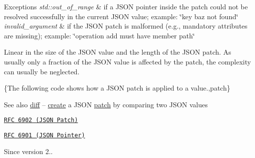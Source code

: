 \begin{DoxyExceptions}{Exceptions}
{\em std\+::out\+\_\+of\+\_\+range} & if a J\+S\+ON pointer inside the patch could not be resolved successfully in the current J\+S\+ON value; example\+: {\ttfamily \char`\"{}key baz
not found\char`\"{}} \\
\hline
{\em invalid\+\_\+argument} & if the J\+S\+ON patch is malformed (e.\+g., mandatory attributes are missing); example\+: {\ttfamily \char`\"{}operation add must have member path\char`\"{}}\\
\hline
\end{DoxyExceptions}
Linear in the size of the J\+S\+ON value and the length of the J\+S\+ON patch. As usually only a fraction of the J\+S\+ON value is affected by the patch, the complexity can usually be neglected.

\{The following code shows how a J\+S\+ON patch is applied to a value.,patch\}

\begin{DoxySeeAlso}{See also}
\hyperlink{classnlohmann_1_1basic__json_a5ef1934868b90452a4a34695489c60cd}{diff} -- \hyperlink{classnlohmann_1_1basic__json_afdb7a485369fbfd8c4c7c134ebb1feb5}{create} a J\+S\+ON \hyperlink{classnlohmann_1_1basic__json_aff9d131320db407da31304fb2b5cb7a5}{patch} by comparing two J\+S\+ON values

\href{https://tools.ietf.org/html/rfc6902}{\tt R\+FC 6902 (J\+S\+ON Patch)} 

\href{https://tools.ietf.org/html/rfc6901}{\tt R\+FC 6901 (J\+S\+ON Pointer)}
\end{DoxySeeAlso}
\begin{DoxySince}{Since}
version 2.. 
\end{DoxySince}
\hypertarget{classnlohmann_1_1basic__json_a486b96adbf4886c38e38c952394a220f}{}\label{classnlohmann_1_1basic__json_a486b96adbf4886c38e38c952394a220f} 
